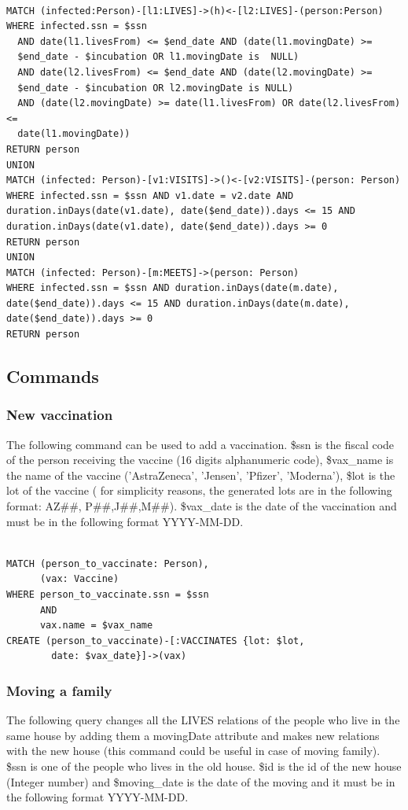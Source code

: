 \documentclass{article}
\begin{document}
\begin{lstlisting}[language=cypher, label=lst:cypher-example]

MATCH (infected:Person)-[l1:LIVES]->(h)<-[l2:LIVES]-(person:Person)
WHERE infected.ssn = $ssn
  AND date(l1.livesFrom) <= $end_date AND (date(l1.movingDate) >=   
  $end_date - $incubation OR l1.movingDate is  NULL)
  AND date(l2.livesFrom) <= $end_date AND (date(l2.movingDate) >=   
  $end_date - $incubation OR l2.movingDate is NULL)
  AND (date(l2.movingDate) >= date(l1.livesFrom) OR date(l2.livesFrom) <= 
  date(l1.movingDate))
RETURN person
UNION
MATCH (infected: Person)-[v1:VISITS]->()<-[v2:VISITS]-(person: Person)
WHERE infected.ssn = $ssn AND v1.date = v2.date AND duration.inDays(date(v1.date), date($end_date)).days <= 15 AND duration.inDays(date(v1.date), date($end_date)).days >= 0
RETURN person
UNION
MATCH (infected: Person)-[m:MEETS]->(person: Person)
WHERE infected.ssn = $ssn AND duration.inDays(date(m.date), date($end_date)).days <= 15 AND duration.inDays(date(m.date), date($end_date)).days >= 0
RETURN person
\end{lstlisting}
\newpage
\subsection{Commands}
\subsubsection{New vaccination}
The following command can be used to add a vaccination. \$ssn is the fiscal code of the person receiving the vaccine (16 digits alphanumeric code), \$vax\_name is the name of the vaccine ('AstraZeneca', 'Jensen', 'Pfizer', 'Moderna'), \$lot is the lot of the vaccine (
for simplicity reasons, the generated lots are in the following format: AZ\#\#, P\#\#,J\#\#,M\#\#). \$vax\_date is the date of the vaccination and must be in the following format YYYY-MM-DD.

\begin{lstlisting}[language=cypher, label=lst:cypher-example]

MATCH (person_to_vaccinate: Person),
      (vax: Vaccine)
WHERE person_to_vaccinate.ssn = $ssn
      AND
      vax.name = $vax_name
CREATE (person_to_vaccinate)-[:VACCINATES {lot: $lot,
        date: $vax_date}]->(vax)

\end{lstlisting}
\subsubsection{Moving a family}
The following query changes all the LIVES relations of the people who live in the same house by adding them a movingDate attribute and makes new relations with the new house (this command could be useful in case of moving family).
\$ssn is one of the people who lives in the old house. \$id is the id of the new house (Integer number) and \$moving\_date is the date of the moving and it must be in the following format YYYY-MM-DD.
\end{document}
